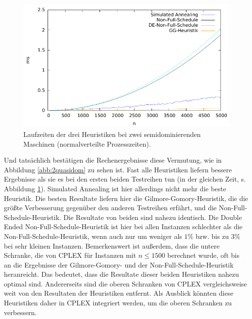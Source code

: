 \documentclass{scrreprt}
\begin{document}
\begin{figure}
    \begin{center}
        \includegraphics[width=.8\textwidth]{../instances/2quasidom/plottime.pdf}
    \end{center}
    \caption{
        \label{abb:2quasidomtime}
        Laufzeiten der drei Heuristiken bei zwei semidominierenden Maschinen (normalverteilte Prozesszeiten).
    }
\end{figure}

Und tatsächlich bestätigen die Rechenergebnisse diese Vermutung, wie in Abbildung \ref{abb:2quasidom} zu sehen ist.
Fast alle Heuristiken liefern bessere Ergebnisse als sie es bei den ersten beiden Testreihen tun (in der gleichen Zeit, s. Abbildung \ref{abb:2quasidomtime}).
Simulated Annealing ist hier allerdings nicht mehr die beste Heuristik.
Die besten Resultate liefern hier die Gilmore-Gomory-Heuristik, die die größte Verbesserung gegenüber den anderen Testreihen erfährt, 
und die Non-Full-Schedule-Heuristik. Die Resultate von beiden sind nahezu identisch.
Die Double Ended Non-Full-Schedule-Heuristik ist hier bei allen Instanzen schlechter als die Non-Full-Schedule-Heuristik, wenn auch nur um weniger als $1\%$
bzw. bis zu $3\%$ bei sehr kleinen Instanzen.
Bemerkenswert ist außerdem, dass die untere Schranke, die von CPLEX für Instanzen mit $n\leq 1500$ berechnet wurde,
oft bis an die Ergebnisse der Gilmore-Gomory- und der Non-Full-Schedule-Heuristik heranreicht.
Das bedeutet, dass die Resultate dieser beiden Heuristiken nahezu optimal sind.
Andererseits sind die oberen Schranken von CPLEX vergleichsweise weit von den Resultaten der Heuristiken entfernt.
Als Ausblick könnten diese Heuristiken daher in CPLEX integriert werden, um die oberen Schranken zu verbessern.
\end{document}
